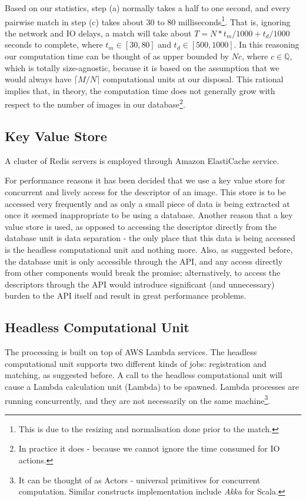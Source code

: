 Based on our statistics, step (a) normally takes a half to one second, and every pairwise match in step (c) takes about 30 to 80 milliseconds\footnote{This is due to the resizing and normalisation done prior to the match.}. That is, ignoring the network and IO delays, a match will take about $T = N * t_m / 1000 + t_d / 1000$ seconds to complete, where $t_m \in [30, 80]$ and $t_d \in [500, 1000]$. In this reasoning our computation time can be thought of as upper bounded by $Nc$, where $c \in \mathbb{Q}$, which is totally size-agnostic, because it is based on the assumption that we would always have $\lceil M / N \rceil$ computational units at our disposal. This rational implies that, in theory, the computation time does not generally grow with respect to the number of images in our database\footnote{In practice it does - because we cannot ignore the time consumed for IO actions.}.

\subsection{Key Value Store}
A cluster of Redis servers is employed through Amazon ElastiCache service. 

For performance reasons it has been decided that we use a key value store for concurrent and lively access for the descriptor of an image. This store is to be accessed very frequently and as only a small piece of data is being extracted at once it seemed inappropriate to be using a database. Another reason that a key value store is used, as opposed to accessing the descriptor directly from the database unit is data separation - the only place that this data is being accessed is the headless computational unit and nothing more. Also, as suggested before, the database unit is only accessible through the API, and any access directly from other components would break the promise; alternatively, to access the descriptors through the API would introduce significant (and unnecessary) burden to the API itself and result in great performance problems.

\subsection{Headless Computational Unit}
The processing is built on top of AWS Lambda services. The headless computational unit supports two different kinds of jobs: registration and matching, as suggested before. A call to the headless computational unit will cause a Lambda calculation unit (Lambda) to be spawned. Lambda processes are running concurrently, and they are not necessarily on the same machine\footnote{It can be thought of as Actors - universal primitives for concurrent computation. Similar constructs implementation include \textit{Akka} for Scala.}.

